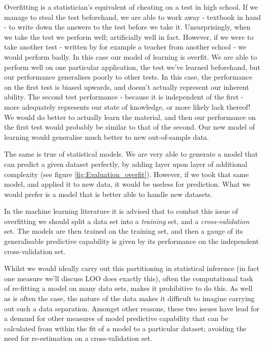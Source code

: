 \documentclass[11pt,fullpage]{book}
\begin{document}
Overfitting is a statistician's equivalent of cheating on a test in high school. If we manage to steal the test beforehand, we are able to work away - textbook in hand - to write down the answers to the test before we take it. Unsurprisingly, when we take the test we perform well; artificially well in fact. However, if we were to take another test - written by for example a teacher from another school - we would perform badly. In this case our model of learning is overfit. We are able to perform well on one particular application, the test we've learned beforehand, but our performance generalises poorly to other tests. In this case, the performance on the first test is biased upwards, and doesn't actually represent our inherent ability. The second test performance - because it is independent of the first - more adequately represents our state of knowledge, or more likely lack thereof! We would do better to actually learn the material, and then our performance on the first test would probably be similar to that of the second. Our new model of learning would generalise much better to new out-of-sample data. 

The same is true of statistical models. We are very able to generate a model that can predict a given dataset perfectly, by adding layer upon layer of additional complexity (see figure \ref{fig:Evaluation_overfit}). However, if we took that same model, and applied it to new data, it would be useless for prediction. What we would prefer is a model that is better able to handle new datasets. 

In the machine learning literature it is advised that to combat this issue of overfitting we should split a data set into a \textit{training} set, and a \textit{cross-validation} set. The models are then trained on the training set, and then a gauge of its generalisable predictive capability is given by its performance on the independent cross-validation set. 

Whilst we would ideally carry out this partitioning in statistical inference (in fact one measure we'll discuss LOO does exactly this), often the computational task of re-fitting a model on many data sets, makes it prohibitive to do this. As well as is often the case, the nature of the data makes it difficult to imagine carrying out such a data separation. Amongst other reasons, these two issues have lead for a demand for other measures of model predictive capability that can be calculated from within the fit of a model to a particular dataset; avoiding the need for re-estimation on a cross-validation set.
\end{document}
